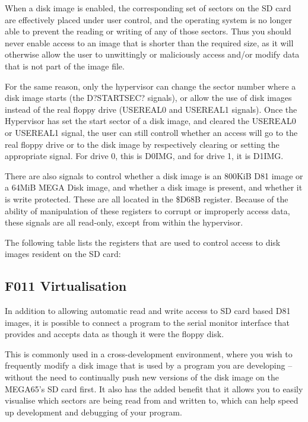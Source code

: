 \begin{enumerate}
When a disk image is enabled, the corresponding set of sectors on the
SD card are effectively placed under user control, and the operating
system is no longer able to prevent the reading or writing of any of
those sectors.  Thus you should never enable access to an image that
is shorter than the required size, as it will otherwise allow the user
to unwittingly or maliciously access and/or modify data that is not
part of the image file.

For the same reason, only the hypervisor can change the sector number
where a disk image starts (the D?STARTSEC? signals), or allow the use
of disk images instead of the real floppy drive (USEREAL0 and USEREAL1
signals).  Once the Hypervisor has set the start sector of a disk
image, and cleared the USEREAL0 or USEREAL1 signal, the user can still
controll whether an access will go to the real floppy drive or to the
disk image by respectively clearing or setting the appropriate
signal.  For drive 0, this is D0IMG, and for drive 1, it is D1IMG.

There are also signals to control whether a disk image is an 800KiB
D81 image or a 64MiB MEGA Disk image, and whether a disk image is
present, and whether it is write protected. These are all located in
the \$D68B register. Because of the ability of manipulation of these
registers to corrupt or improperly access data, these signals are all
read-only, except from within the hypervisor.

The following table lists the registers that are used to control
access to disk images resident on the SD card:



\subsection{F011 Virtualisation}

In addition to allowing automatic read and write access to SD card
based D81 images, it is possible to connect a program to the serial
monitor interface that provides and accepts data as though it were the
floppy disk.

This is commonly used in a cross-development
environment, where you wish to frequently modify a disk image that is
used by a program you are developing -- without the need to
continually push new versions of the disk image on the MEGA65's
SD card first. It also has the added benefit that it allows you to
easily visualise which sectors are being read from and written to,
which can help speed up development and debugging of your program.


\end{enumerate}
